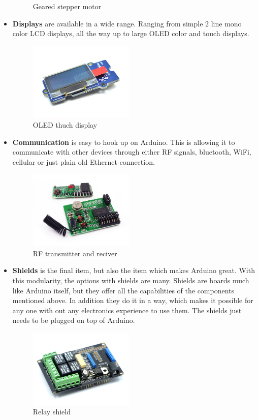 \begin{itemize}
\begin{figure}[H]
\caption{Geared stepper motor}
\end{figure}
\item[] \textbf{Displays} are available in a wide range. Ranging from simple 2 line mono color LCD displays, all the way up to large OLED color and touch displays. 
\begin{figure}[H]
\centering
\includegraphics[width=5cm]{billeder/display.jpg}
\caption{OLED thuch display}
\end{figure}
\item[] \textbf{Communication} is easy to hook up on Arduino. This is allowing it to communicate with other devices through either RF signals, bluetooth, WiFi, cellular or just plain old Ethernet connection.
\begin{figure}[H]
\centering
\includegraphics[width=5cm]{billeder/com.jpg}
\caption{RF transmitter and reciver}
\end{figure}
\item[] \textbf{Shields} is the final item, but also the item which makes Arduino great. With this modularity, the options with shields are many. Shields are boards much like Arduino itself, but they offer all the capabilities of the components mentioned above. In addition they do it in a way, which makes it possible for any one with out any electronics experience to use them. The shields just needs to be plugged on top of Arduino.
\begin{figure}[H]
\centering
\includegraphics[width=5cm]{billeder/Shield.jpg}
\caption{Relay shield}
\end{figure}

\end{itemize}


